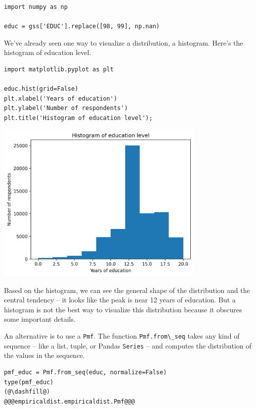 \begin{lstlisting}[]
import numpy as np

educ = gss['EDUC'].replace([98, 99], np.nan)
\end{lstlisting}

We've already seen one way to visualize a distribution, a histogram.
Here's the histogram of education level.

\begin{lstlisting}[]
import matplotlib.pyplot as plt

educ.hist(grid=False)
plt.xlabel('Years of education')
plt.ylabel('Number of respondents')
plt.title('Histogram of education level');
\end{lstlisting}

\begin{center}
\includegraphics[width=4in]{chapters/08_distributions_files/08_distributions_34_0.png}
\end{center}

Based on the histogram, we can see the general shape of the distribution
and the central tendency -- it looks like the peak is near 12 years of
education. But a histogram is not the best way to visualize this
distribution because it obscures some important details.

An alternative is to use a \passthrough{\lstinline!Pmf!}. The function
\passthrough{\lstinline!Pmf.from\_seq!} takes any kind of sequence --
like a list, tuple, or Pandas \passthrough{\lstinline!Series!} -- and
computes the distribution of the values in the sequence.

\begin{lstlisting}[]
pmf_educ = Pmf.from_seq(educ, normalize=False)
type(pmf_educ)
(@\dashfill@)
@@@empiricaldist.empiricaldist.Pmf@@@
\end{lstlisting}


